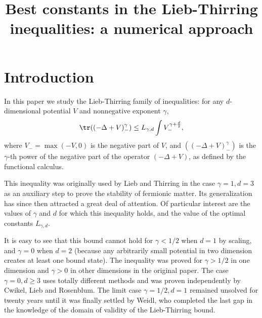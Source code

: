 \documentclass[10pt,a4paper,reqno]{amsart}
\begin{document}
\title{Best constants in the Lieb-Thirring inequalities: a numerical
  approach}
\maketitle
\tableofcontents
\section{Introduction}
In this paper we study the Lieb-Thirring family of inequalities: for
any $d$-dimensional potential $V$ and nonnegative exponent $\gamma$,
\begin{align}
  \label{LT}
  \tr((-\Delta + V)_{-}^{\gamma}) \leq L_{\gamma,d} \int V^{\gamma + \frac d 2}_{-},
\end{align}
where $V_{-} = \max(-V,0)$ is the negative part of $V$, and $((-\Delta
+ V)_{-}^{\gamma})$ is the $\gamma$-th power of the negative part of
the operator $(-\Delta + V)$, as defined by the functional calculus.

This inequality was originally used by Lieb and Thirring in the case
$\gamma = 1, d = 3$ as an auxiliary step to prove the stability of
fermionic matter\cite{lieb1975bound}. Its generalization has since
then attracted a great deal of attention. Of particular interest are
the values of $\gamma$ and $d$ for which this inequality holds, and
the value of the optimal constants $L_{\gamma,d}$.

It is easy to see that this bound cannot hold for $\gamma < 1/2$ when
$d = 1$ by scaling, and $\gamma = 0$ when $d = 2$ (because any
arbitrarily small potential in two dimension creates at least one
bound state). The inequality was proved for $\gamma > 1/2$ in one
dimension and $\gamma > 0$ in other dimensions in the original
paper\cite{lieb1975bound}. The case $\gamma = 0, d \geq 3$ uses
totally different methods and was proven independently by Cwikel, Lieb
and Rosenblum\cite{cwikel1977weak,liebclr,rozenblum1972}. The limit
case $\gamma = 1/2, d = 1$ remained unsolved for twenty years until it
was finally settled by Weidl\cite{weidl1996}, who completed the last
gap in the knowledge of the domain of validity of the Lieb-Thirring
bound.
\end{document}

